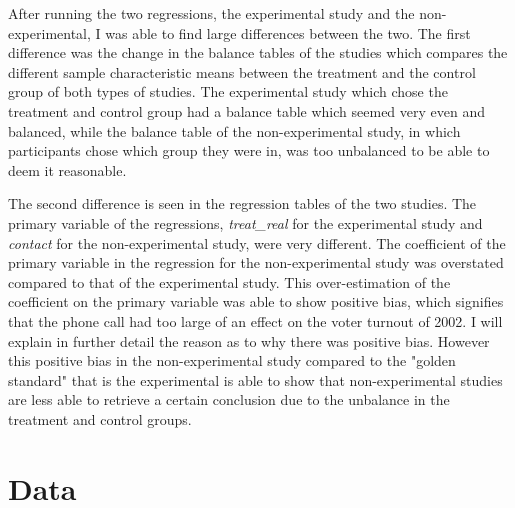 \documentclass[a4paper]{article}
\begin{document}
\begin{flushleft}
After running the two regressions, the experimental study and the non-experimental, I was able to find large differences between the two. The first difference was the change in the balance tables of the studies which compares the different sample characteristic means between the treatment and the control group of both types of studies. The experimental study which chose the treatment and control group had a balance table which seemed very even and balanced, while the balance table of the non-experimental study, in which participants chose which group they were in, was too unbalanced to be able to deem it reasonable. \newline

The second difference is seen in the regression tables of the two studies. The primary variable of the regressions, \textit{treat\_real} for the experimental study and \textit{contact} for the non-experimental study, were very different. The coefficient of the primary variable in the regression for the non-experimental study was overstated compared to that of the experimental study. This over-estimation of the coefficient on the primary variable was able to show positive bias, which signifies that the phone call had too large of an effect on the voter turnout of 2002. I will explain in further detail the reason as to why there was positive bias. However this positive bias in the non-experimental study compared to the "golden standard" that is the experimental is able to show that non-experimental studies are less able to retrieve a certain conclusion due to the unbalance in the treatment and control groups. 
\end{flushleft}
\section{Data}
\end{document}
